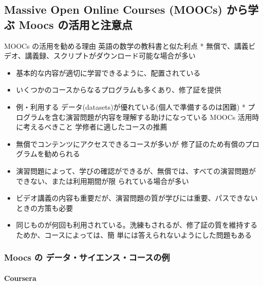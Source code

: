 \documentclass[
]{book}
\providecommand{\tightlist}{%
  \setlength{\itemsep}{0pt}\setlength{\parskip}{0pt}}
\theoremstyle{definition}
\theoremstyle{definition}
\theoremstyle{definition}
\theoremstyle{definition}
\theoremstyle{remark}
\begin{document}
\hypertarget{massive-open-online-courses-moocs-ux304bux3089ux5b66ux3076-moocs-ux306eux6d3bux7528ux3068ux6ce8ux610fux70b9}{%
\subsection{Massive Open Online Courses (MOOCs) から学ぶ Moocs の活用と注意点}\label{massive-open-online-courses-moocs-ux304bux3089ux5b66ux3076-moocs-ux306eux6d3bux7528ux3068ux6ce8ux610fux70b9}}

MOOCs の活用を勧める理由 英語の数学の教科書と似た利点 * 無償で、講義ビデオ、講義録、スクリプトがダウンロード可能な場合が多い

\begin{itemize}
\tightlist
\item
  基本的な内容が適切に学習できるように、配置されている
\item
  いくつかのコースからなるプログラムも多くあり、修了証を提供
\item
  例・利用する データ(datasets)が優れている(個人で準備するのは困難) * プログラムを含む演習問題が内容を理解する助けになっている
  MOOCs 活用時に考えるべきこと
  学修者に適したコースの推薦
\item
  無償でコンテンツにアクセスできるコースが多いが 修了証のため有償のプログラムを勧められる
\item
  演習問題によって、学びの確認ができるが、無償では、すべての演習問題ができない、または利用期間が限
  られている場合が多い
\item
  ビデオ講義の内容も重要だが、演習問題の質が学びには重要、パスできないときの方策も必要
\item
  同じものが何回も利用されている。洗練もされるが、修了証の質を維持するためか、コースによっては、簡 単には答えられないようにした問題もある
\end{itemize}

\hypertarget{moocs-ux306e-ux30c7ux30fcux30bfux30b5ux30a4ux30a8ux30f3ux30b9ux30b3ux30fcux30b9ux306eux4f8b}{%
\subsubsection{Moocs の データ・サイエンス・コースの例}\label{moocs-ux306e-ux30c7ux30fcux30bfux30b5ux30a4ux30a8ux30f3ux30b9ux30b3ux30fcux30b9ux306eux4f8b}}

\hypertarget{coursera}{%
\paragraph{Coursera}\label{coursera}}
\end{document}
